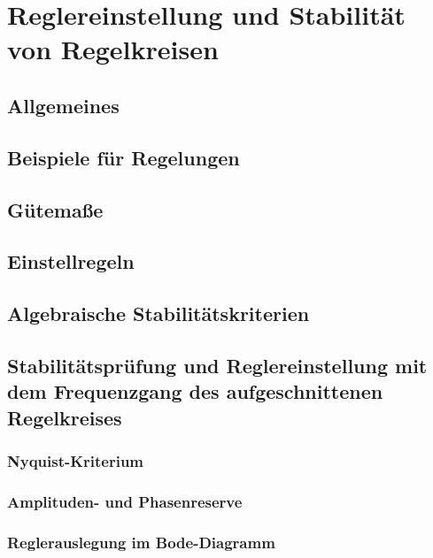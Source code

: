 \section{Reglereinstellung und Stabilität von Regelkreisen}


\subsection{Allgemeines}


\subsection{Beispiele für Regelungen}


\subsection{Gütemaße}


\subsection{Einstellregeln}


\subsection{Algebraische Stabilitätskriterien}


\subsection{Stabilitätsprüfung und Reglereinstellung mit dem Frequenzgang des aufgeschnittenen Regelkreises}


\subsubsection{Nyquist-Kriterium}


\subsubsection{Amplituden- und Phasenreserve}


\subsubsection{Reglerauslegung im Bode-Diagramm}
